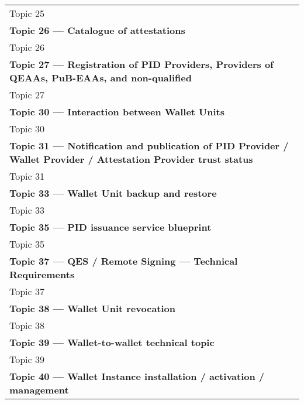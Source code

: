 \begin{landscape}
\begin{longtable}{p{3cm} p{10cm} p{7cm}}
Topic 25 &
 &
\\

\multicolumn{3}{l}{\textbf{Topic 26 — Catalogue of attestations}}\\

Topic 26 &
 &
\\

\multicolumn{3}{l}{\textbf{Topic 27 — Registration of PID Providers, Providers of QEAAs, PuB-EAAs, and non-qualified}}\\

Topic 27 &
 &
\\

\multicolumn{3}{l}{\textbf{Topic 30 — Interaction between Wallet Units}}\\

Topic 30 &
 &
\\

\multicolumn{3}{l}{\textbf{Topic 31 — Notification and publication of PID Provider / Wallet Provider / Attestation Provider trust status}}\\

Topic 31 &
 &
\\

\multicolumn{3}{l}{\textbf{Topic 33 — Wallet Unit backup and restore}}\\

Topic 33 &
 &
\\

\multicolumn{3}{l}{\textbf{Topic 35 — PID issuance service blueprint}}\\

Topic 35 &
 &
\\

\multicolumn{3}{l}{\textbf{Topic 37 — QES / Remote Signing — Technical Requirements}}\\

Topic 37 &
 &
\\

\multicolumn{3}{l}{\textbf{Topic 38 — Wallet Unit revocation}}\\

Topic 38 &
 &
\\

\multicolumn{3}{l}{\textbf{Topic 39 — Wallet-to-wallet technical topic}}\\

Topic 39 &
 &
\\

\multicolumn{3}{l}{\textbf{Topic 40 — Wallet Instance installation / activation / management}}\\


\end{longtable}
\end{landscape}
